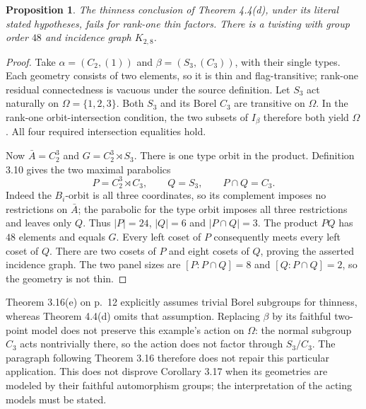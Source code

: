 \documentclass[11pt,a4paper]{article}
\newtheorem{proposition}{Proposition}
\begin{document}
\begin{proposition}\label{p:thin}
The thinness conclusion of Theorem 4.4(d), under its literal stated
hypotheses, fails for rank-one thin factors. There is a twisting with
group order $48$ and incidence graph $K_{2,8}$.
\end{proposition}
\begin{proof}
Take $\alpha=(C_2,(1))$ and $\beta=(S_3,(C_3))$, with their single types.
Each geometry consists of two elements, so it is thin and flag-transitive;
rank-one residual connectedness is vacuous under the source definition.
Let $S_3$ act naturally on $\Omega=\{1,2,3\}$. Both $S_3$ and its Borel
$C_3$ are transitive on $\Omega$. In the rank-one orbit-intersection
condition, the two subsets of $I_\beta$ therefore both yield $\Omega$.
All four required intersection equalities hold.

Now $\bar A=C_2^3$ and $G=C_2^3\rtimes S_3$. There is one type orbit in
the product. Definition 3.10 gives the two maximal parabolics
\[
 P=C_2^3\rtimes C_3,\qquad Q=S_3,
 \qquad P\cap Q=C_3.
\]
Indeed the $B_i$-orbit is all three coordinates, so its complement imposes
no restrictions on $\bar A$; the parabolic for the type orbit imposes all
three restrictions and leaves only $Q$. Thus $|P|=24$, $|Q|=6$ and
$|P\cap Q|=3$. The product $PQ$ has $48$ elements and equals $G$.
Every left coset of $P$ consequently meets every left coset of $Q$.
There are two cosets of $P$ and eight cosets of $Q$, proving the asserted
incidence graph. The two panel sizes are $[P:P\cap Q]=8$ and
$[Q:P\cap Q]=2$, so the geometry is not thin.
\end{proof}
Theorem 3.16(e) on p.~12 explicitly assumes trivial Borel subgroups for
thinness, whereas Theorem 4.4(d) omits that assumption. Replacing $\beta$
by its faithful two-point model does not preserve this example's action on
$\Omega$: the normal subgroup $C_3$ acts nontrivially there, so the action
does not factor through $S_3/C_3$. The paragraph following Theorem 3.16
therefore does not repair this particular application. This does not
disprove Corollary 3.17 when its geometries are modeled by their faithful
automorphism groups; the interpretation of the acting models must be stated.
\end{document}
